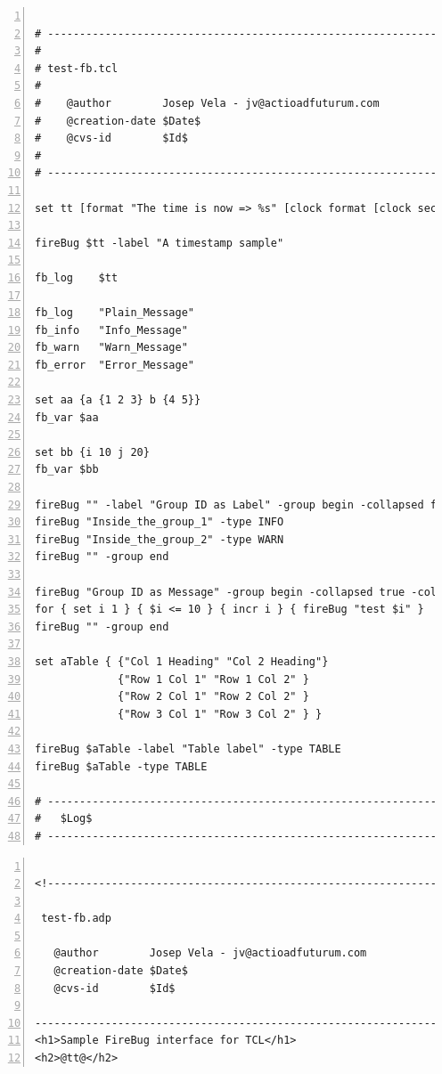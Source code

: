 \documentclass{tufte-handout}
\begin{document}
\begin{Verbatim}[fontsize=\footnotesize,frame=lines,label=Código Fuente: test-fb.tcl,labelposition=topline,numbers=left,stepnumber=1,samepage=true]

# ----------------------------------------------------------------------
#
# test-fb.tcl 
#
#    @author        Josep Vela - jv@actioadfuturum.com
#    @creation-date $Date$
#    @cvs-id        $Id$
#
# ----------------------------------------------------------------------

set tt [format "The time is now => %s" [clock format [clock seconds] -format %H:%M:%S] ]

fireBug $tt -label "A timestamp sample"

fb_log    $tt 

fb_log    "Plain_Message" 
fb_info   "Info_Message" 
fb_warn   "Warn_Message"
fb_error  "Error_Message"

set aa {a {1 2 3} b {4 5}}
fb_var $aa

set bb {i 10 j 20}
fb_var $bb

fireBug "" -label "Group ID as Label" -group begin -collapsed false 
fireBug "Inside_the_group_1" -type INFO 
fireBug "Inside_the_group_2" -type WARN
fireBug "" -group end 

fireBug "Group ID as Message" -group begin -collapsed true -color "#FF00FF"
for { set i 1 } { $i <= 10 } { incr i } { fireBug "test $i" }
fireBug "" -group end

set aTable { {"Col 1 Heading" "Col 2 Heading"} 
             {"Row 1 Col 1" "Row 1 Col 2" } 
             {"Row 2 Col 1" "Row 2 Col 2" } 
             {"Row 3 Col 1" "Row 3 Col 2" } }

fireBug $aTable -label "Table label" -type TABLE
fireBug $aTable -type TABLE

# ----------------------------------------------------------------------
#   $Log$
# ----------------------------------------------------------------------

\end{Verbatim}

\newpage
\begin{Verbatim}[fontsize=\footnotesize,frame=lines,label=Código Fuente Plantilla: test-fb.adp,labelposition=topline,numbers=left,stepnumber=1,samepage=true]

<!--------------------------------------------------------------------- 

 test-fb.adp 

   @author        Josep Vela - jv@actioadfuturum.com
   @creation-date $Date$
   @cvs-id        $Id$

----------------------------------------------------------------------->
<h1>Sample FireBug interface for TCL</h1>
<h2>@tt@</h2>

\end{Verbatim}
\end{document}
